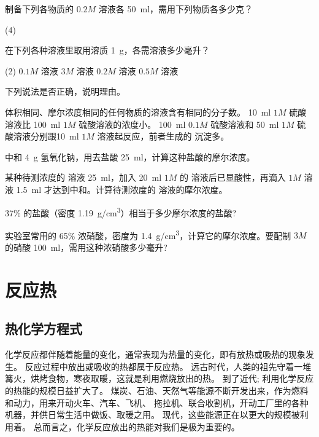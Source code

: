 \begin{Practice}[习题]
  \begin{question}
    \item 制备下列各物质的 $0.2M$ 溶液各 \qty{50}{ml}，需用下列物质各多少克？
    \begin{tasks}(4)
      \task {}
      \task {}
      \task {}
      \task {}
    \end{tasks}
    \item 在下列各种溶液里取用溶质 \qty{1}{g}，各需溶液多少毫升？
    \begin{tasks}(2)
      \task $0.1M$  溶液
      \task $3M$    溶液
      \task $0.2M$  溶液
      \task $0.5M$  溶液
    \end{tasks}
    \item 下列说法是否正确，说明理由。
    \begin{tasks}
      \task 体积相同、摩尔浓度相同的任何物质的溶液含有相同的分子数。
      \task \qty{10}{ml} $1M$ 硫酸溶液比 \qty{100}{ml} $1M$ 硫酸溶液的浓度小。
      \task \qty{100}{ml} $0.1M$ 硫酸溶液和 \qty{50}{ml} $1M$ 硫酸溶液分别跟\qty{10}{ml} $1M$  溶液起反应，前者生成的  沉淀多。 
    \end{tasks}
    \item 中和 \qty{4}{g} 氢氧化钠，用去盐酸 \qty{25}{ml}，计算这种盐酸的摩尔浓度。
    \item 某种待测浓度的  溶液 \qty{25}{ml}，加入 \qty{20}{ml} $1M$ 的  溶液后已显酸性，再滴入 $1M$  溶液 \qty{1.5}{ml} 才达到中和。计算待测浓度的  溶液的摩尔浓度。
    \item 37\% 的盐酸（密度 \qty{1.19}{g/cm^3}）相当于多少摩尔浓度的盐酸?
    \item 实验室常用的 65\% 浓硝酸，密度为 \qty{1.4}{g/cm^3}，计算它的摩尔浓度。要配制 $3M$ 的硝酸 \qty{100}{ml}，需用这种浓硝酸多少毫升?
  \end{question}
\end{Practice}

\section{反应热}
\subsection{热化学方程式}
化学反应都伴随着能量的变化，通常表现为热量的变化，即有放热或吸热的现象发生。
反应过程中放出或吸收的热都属于反应热。
远古时代，人类的祖先守着一堆篝火，烘烤食物，寒夜取暖，这就是利用燃烧放出的热。
到了近代; 利用化学反应的热能的规模日益扩大了。
煤炭、石油、天然气等能源不断开发出来，作为燃料和动力，用来开动火车、汽车、飞机、 拖拉机、联合收割机，开动工厂里的各种机器，并供日常生活中做饭、取暖之用。
现代，这些能源正在以更大的规模被利用着。
总而言之，化学反应放出的热能对我们是极为重要的。

